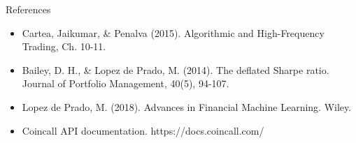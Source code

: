 \documentclass[aspectratio=169,10pt]{beamer}
\begin{document}
\begin{frame}{References}
\scriptsize\begin{itemize}\setlength{\itemsep}{3pt}
  \item Cartea, Jaikumar, \& Penalva (2015). Algorithmic and High-Frequency Trading, Ch. 10-11.
  \item Bailey, D. H., \& Lopez de Prado, M. (2014). The deflated Sharpe ratio. Journal of Portfolio Management, 40(5), 94-107.
  \item Lopez de Prado, M. (2018). Advances in Financial Machine Learning. Wiley.
  \item Coincall API documentation. https://docs.coincall.com/
\end{itemize}
\end{frame}
\end{document}
